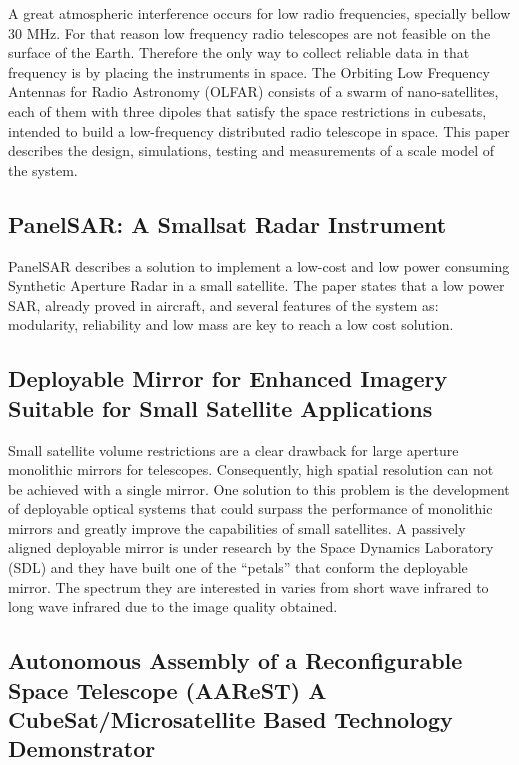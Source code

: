 A great atmospheric interference occurs for low radio frequencies,
specially bellow 30 MHz. For that reason low frequency radio telescopes
are not feasible on the surface of the Earth. Therefore the only way
to collect reliable data in that frequency is by placing the instruments
in space. The Orbiting Low Frequency Antennas for Radio Astronomy
(OLFAR) consists of a swarm of nano-satellites, each of them with
three dipoles that satisfy the space restrictions in cubesats, intended
to build a low-frequency distributed radio telescope in space. This
paper describes the design, simulations, testing and measurements
of a scale model of the system. \cite{Quillen_FF_RadioTelescope}

\subsection{PanelSAR: A Smallsat Radar Instrument}

PanelSAR describes a solution to implement a low-cost and low power
consuming Synthetic Aperture Radar in a small satellite. The paper
states that a low power SAR, already proved in aircraft, and several
features of the system as: modularity, reliability and low mass are
key to reach a low cost solution.\cite{Dujin_Radar}

\subsection{Deployable Mirror for Enhanced Imagery Suitable for Small Satellite Applications}

Small satellite volume restrictions are a clear drawback for large
aperture monolithic mirrors for telescopes. Consequently, high spatial
resolution can not be achieved with a single mirror. One solution
to this problem is the development of deployable optical systems that
could surpass the performance of monolithic mirrors and greatly improve
the capabilities of small satellites. A passively aligned deployable
mirror is under research by the Space Dynamics Laboratory (SDL) and
they have built one of the ``petals'' that conform the deployable
mirror. The spectrum they are interested in varies from short wave
infrared to long wave infrared due to the image quality obtained.\cite{Champagne_deployablemirror}

\subsection{Autonomous Assembly of a Reconfigurable Space Telescope (AAReST) \textendash{} A CubeSat/Microsatellite Based Technology Demonstrator}

